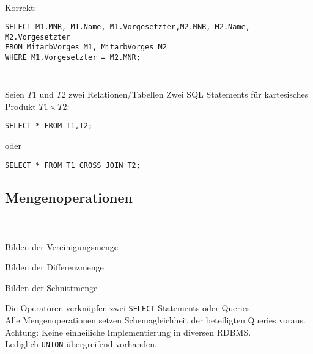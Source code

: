 \begin{frame}[fragile]\frametitle{\insertsection}
\framesubtitle{\insertsubsection}
\onslide
{}\\[4pt]
Korrekt:
\begin{lstlisting}[xleftmargin=3ex]
SELECT M1.MNR, M1.Name, M1.Vorgesetzter,M2.MNR, M2.Name, M2.Vorgesetzter
FROM MitarbVorges M1, MitarbVorges M2
WHERE M1.Vorgesetzter = M2.MNR;
\end{lstlisting}
\end{frame}

\begin{frame}[fragile]\frametitle{\insertsection}
\framesubtitle{\insertsubsection}
\\[4pt]
Seien $T1$ und $T2$ zwei Relationen/Tabellen
\abs
Zwei SQL Statements f\"ur kartesisches Produkt $T1\times T2$:
\abs
\begin{lstlisting}[xleftmargin=3ex, numbers=none]
SELECT * FROM T1,T2;
\end{lstlisting}
\abs
oder
\abs
\begin{lstlisting}[xleftmargin=3ex, numbers=none]
SELECT * FROM T1 CROSS JOIN T2;
\end{lstlisting}
\end{frame}

\subsection{Mengenoperationen}
\begin{frame}[fragile]\frametitle{\insertsection}
\framesubtitle{\insertsubsection}
\onslide
{}\\[4pt]
\begin{description}[leftmargin=0cm]
	\item[\texttt{UNION}] Bilden der Vereinigungsmenge
	\item[\texttt{EXCEPT}] Bilden der Differenzmenge
	\item[\texttt{INTERSECT}] Bilden der Schnittmenge
\end{description}
\abs
Die Operatoren verkn\"upfen zwei \texttt{SELECT}-Statements oder Queries.\\
Alle Mengenoperationen setzen Schemagleichheit der beteiligten Queries voraus.
\pause 
\abs
\alert{Achtung: Keine einheiliche Implementierung in diversen RDBMS.\\
	Lediglich \texttt{UNION} übergreifend vorhanden.}
\end{frame}

